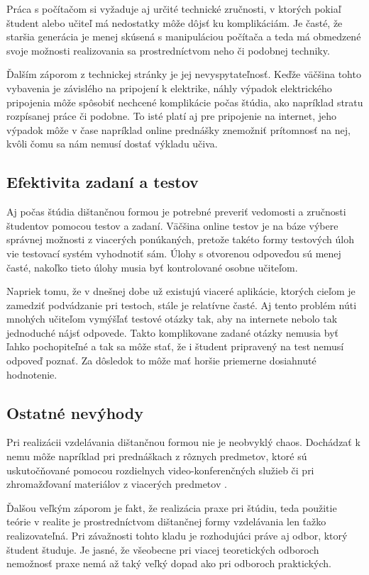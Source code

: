 \documentclass[10pt,slovak,a4paper]{article}
\begin{document}
	Práca s počítačom si vyžaduje aj určité technické zručnosti, v ktorých pokiaľ študent alebo učiteľ má nedostatky môže dôjsť ku komplikáciám. Je časté, že staršia generácia je menej skúsená s manipuláciou počítača a teda má obmedzené svoje možnosti realizovania sa prostredníctvom neho či podobnej techniky.

	Ďalším záporom z technickej stránky je jej nevyspytateľnosť. Keďže väčšina tohto vybavenia je závislého na pripojení k elektrike, náhly výpadok elektrického pripojenia môže spôsobiť nechcené komplikácie počas štúdia, ako napríklad stratu rozpísanej práce či podobne. To isté platí aj pre pripojenie na internet, jeho výpadok môže v čase napríklad online prednášky znemožniť prítomnosť na nej, kvôli čomu sa nám nemusí dostať výkladu učiva.

\subsection{Efektivita zadaní a testov}
	Aj počas štúdia dištančnou formou je potrebné preveriť vedomosti a zručnosti študentov pomocou testov a zadaní. Väčšina online testov je na báze výbere správnej možnosti z viacerých ponúkaných, pretože takéto formy testových úloh vie testovací systém vyhodnotiť sám. Úlohy s otvorenou odpoveďou sú menej časté, nakoľko tieto úlohy musia byť kontrolované osobne učiteľom. 

	Napriek tomu, že v dnešnej dobe už existujú viaceré aplikácie, ktorých cieľom je zamedziť podvádzanie pri testoch, stále je relatívne časté. Aj tento problém núti mnohých učiteľom vymýšľať testové otázky tak, aby na internete nebolo tak jednoduché nájsť odpovede. Takto komplikovane zadané otázky nemusia byť ľahko pochopiteľné a tak sa môže stať, že i študent pripravený na test nemusí odpoveď poznať. Za dôsledok to môže mať horšie priemerne dosiahnuté hodnotenie. 

\subsection{Ostatné nevýhody}
	Pri realizácii vzdelávania dištančnou formou nie je neobvyklý chaos. Dochádzať k nemu môže napríklad pri prednáškach z rôznych predmetov, ktoré sú uskutočňované pomocou rozdielnych video-konferenčných služieb či pri zhromažďovaní materiálov z viacerých predmetov .

	Ďalšou veľkým záporom je fakt, že realizácia praxe pri štúdiu, teda použitie teórie v realite je prostredníctvom dištančnej formy vzdelávania len ťažko realizovateľná. Pri závažnosti tohto kladu je rozhodujúci práve aj odbor, ktorý študent študuje. Je jasné, že všeobecne pri viacej teoretických odboroch nemožnosť praxe nemá až taký veľký dopad ako pri odboroch praktických.
\end{document}
